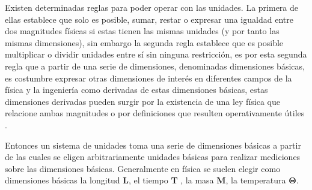 \documentclass[master.tex]{subfiles}
\begin{document}
    Existen determinadas reglas para poder operar con las unidades. La primera de ellas establece que solo es posible, sumar, restar o expresar una igualdad entre dos magnitudes físicas si estas tienen las mismas unidades (y por tanto las mismas dimensiones), sin embargo la segunda regla establece que es posible multiplicar o dividir unidades entre sí sin ninguna restricción, es por esta segunda regla que a partir de una serie de dimensiones, denominadas dimensiones básicas, es costumbre expresar otras dimensiones de interés en diferentes campos de la física y la ingeniería como derivadas de estas dimensiones básicas, estas dimensiones derivadas pueden surgir por la existencia de una ley física que relacione ambas magnitudes o por definiciones que resulten operativamente útiles \parencites{himme}{volker}.

    Entonces un sistema de unidades toma una serie de dimensiones básicas a partir de las cuales se eligen arbitrariamente unidades básicas para realizar mediciones sobre las dimensiones básicas. Generalmente en física se suelen elegir como dimensiones básicas la longitud \textbf{L}, el tiempo \textbf{T} , la masa \textbf{M}, la temperatura \( \bm{\Theta} \).

    
    \renewcommand{\nomname}{Nomenclatura del capítlo}
    \printnomenclature
    
    \printbibliography[title=Bibliografía del capítulo]
\end{document}
